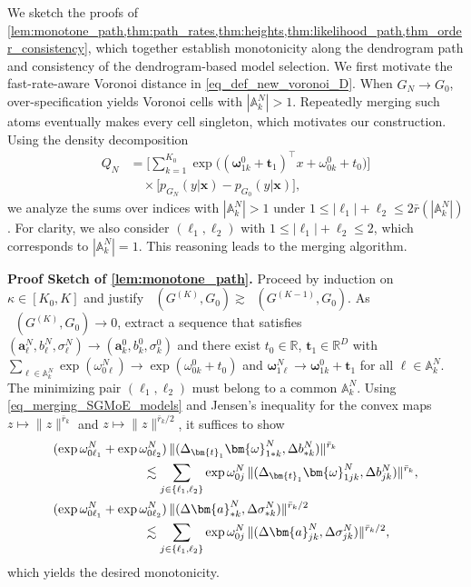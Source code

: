 \documentclass[twoside]{article}
\DeclareMathOperator*{\VDFRA}{D_{FRA}}
\theoremstyle{plain}
\theoremstyle{definition}
\theoremstyle{plain}
\def\vomega{{\bm{\omega}}}
\def\vell{{\bm{\ell}}}
\def\va{{\bm{a}}}
\def\vt{{\bm{t}}}
\def\vx{{\bm{x}}}
\def\sA{{\mathbb{A}}}
\newcommand{\R}{\mathbb{R}}
\begin{document}
We sketch the proofs of \cref{lem:monotone_path,thm:path_rates,thm:heights,thm:likelihood_path,thm_order_consistency}, which together establish monotonicity along the dendrogram path and consistency of the dendrogram-based model selection. We first motivate the fast-rate-aware Voronoi distance in \cref{eq_def_new_voronoi_D}. When $\widehat{G}_N \to G_0$, over-specification yields Voronoi cells with $|\sA_k^N|>1$. Repeatedly merging such atoms eventually makes every cell singleton, which motivates our construction. Using the density decomposition
\begin{align*}
    Q_{N}&=\Big[\sum_{k=1}^{K_{0}} \exp \big((\vomega_{1 k}^{0}+\vt_1)^{\top} x+\omega_{0 k}^{0}+t_{0}\big)\Big]\\
    &\quad \times\big[p_{G_{N}}(y|\vx)-p_{G_{0}}(y|\vx)\big],
\end{align*}
we analyze the sums over indices with $|\sA_k^N|>1$ under $1 \le |\vell_1|+\ell_2 \le 2\bar r(|\sA_k^N|)$. For clarity, we also consider $(\vell_1,\ell_2)$ with $1 \le |\vell_1|+\ell_2 \le 2$, which corresponds to $|\sA_k^N|=1$. This reasoning leads to the merging algorithm.

{\bf Proof Sketch of \cref{lem:monotone_path}.}
Proceed by induction on $\kappa\in[K_0,K]$ and justify $\VDFRA(G^{(K)},G_0)\gtrsim \VDFRA(G^{(K-1)},G_0)$. As $\VDFRA(G^{(K)},G_0)\to0$, extract a sequence that satisfies $(\va_{\ell}^N,b_{\ell}^N,\sigma_{\ell}^N)\to(\va_k^0,b_k^0,\sigma_k^0)$ and there exist $t_0\in\R$, $\vt_1\in\R^{D}$ with $\sum_{\ell\in\sA_k^N}\exp(\omega_{0\ell}^N)\to \exp(\omega_{0k}^0+t_0)$ and $\vomega_{1\ell}^N\to \vomega_{1k}^0+\vt_1$ for all $\ell\in\sA_k^N$. The minimizing pair $(\ell_1,\ell_2)$ must belong to a common $\sA_k^N$. Using \cref{eq_merging_SGMoE_models} and Jensen’s inequality for the convex maps $z\mapsto\|z\|^{\bar r_k}$ and $z\mapsto\|z\|^{\bar r_k/2}$, it suffices to show
\begin{align*}
&(\exp\omega_{0\ell_1}^N+\exp\omega_{0\ell_2}^N)\, \|(\Delta_{\vt_1}\vomega_{1 * k}^N,\Delta b_{*k}^N)\|^{\bar r_k}\\
&\hspace{2.5cm} \lesssim \sum_{j\in\{\ell_1,\ell_2\}}\exp\omega_{0j}^N\,\|(\Delta_{\vt_1}\vomega_{1 j k}^N,\Delta b_{j k}^N)\|^{\bar r_k},\\
&(\exp\omega_{0\ell_1}^N+\exp\omega_{0\ell_2}^N)\, \|(\Delta \va_{* k}^N,\Delta \sigma_{* k}^N)\|^{\bar r_k/2}\\
&\hspace{2.5cm}\lesssim \sum_{j\in\{\ell_1,\ell_2\}}\exp\omega_{0j}^N\,\|(\Delta \va_{j k}^N,\Delta \sigma_{j k}^N)\|^{\bar r_k/2},
\end{align*}
which yields the desired monotonicity.
\end{document}
